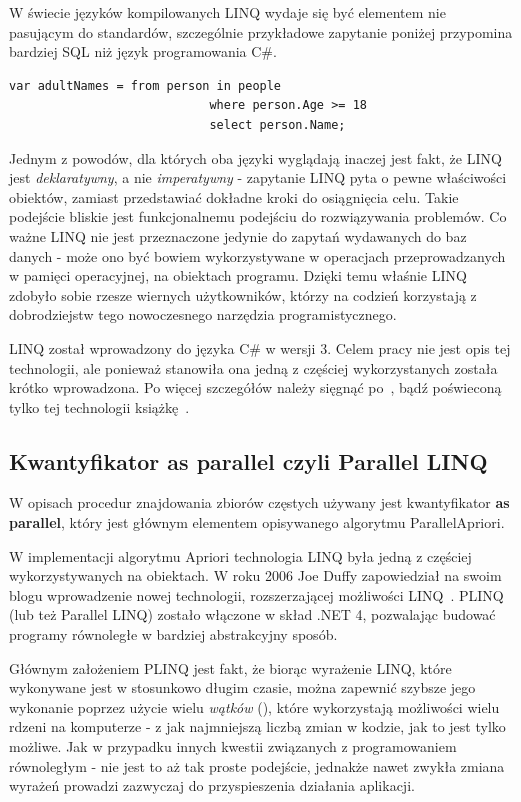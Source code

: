 W świecie języków kompilowanych LINQ wydaje się być elementem nie pasującym do standardów, szczególnie przykładowe zapytanie poniżej przypomina bardziej SQL niż język programowania C\#. 

\begin{lstlisting}
var adultNames = from person in people
							where person.Age >= 18
							select person.Name;
\end{lstlisting}

Jednym z powodów, dla których oba języki wyglądają inaczej jest fakt, że LINQ jest \emph{deklaratywny}, a nie \emph{imperatywny} - zapytanie LINQ pyta o pewne właściwości obiektów, zamiast przedstawiać dokładne kroki do osiągnięcia celu. Takie podejście bliskie jest funkcjonalnemu podejściu do rozwiązywania problemów. Co ważne LINQ nie jest przeznaczone jedynie do zapytań wydawanych do baz danych - może ono być bowiem wykorzystywane w operacjach przeprowadzanych w pamięci operacyjnej, na obiektach programu. Dzięki temu właśnie LINQ zdobyło sobie rzesze wiernych użytkowników, którzy na codzień korzystają z dobrodziejstw tego nowoczesnego narzędzia programistycznego.

LINQ został wprowadzony do języka C\# w wersji 3. Celem pracy nie jest opis tej technologii, ale ponieważ stanowiła ona jedną z częściej wykorzystanych została krótko wprowadzona. Po więcej szczegółów należy sięgnąć po~\cite{cSharp:inDepthS}, bądź poświeconą tylko tej technologii książkę~\cite{cSharp:linq}.

\subsection{Kwantyfikator as parallel czyli Parallel LINQ}\label{sec:asparallel}
W opisach procedur znajdowania zbiorów częstych używany jest kwantyfikator \textbf{as parallel}, który jest głównym elementem opisywanego algorytmu ParallelApriori. 

W implementacji algorytmu Apriori technologia LINQ była jedną z częściej wykorzystywanych na obiektach. W roku 2006 Joe Duffy zapowiedział na swoim blogu wprowadzenie nowej technologii, rozszerzającej możliwości LINQ~\cite{cs:helloplinq}. PLINQ (lub też Parallel LINQ) zostało włączone w skład .NET 4, pozwalając budować programy równoległe w bardziej abstrakcyjny sposób. 

Głównym założeniem PLINQ jest fakt, że biorąc wyrażenie LINQ, które wykonywane jest w stosunkowo długim czasie, można zapewnić szybsze jego wykonanie poprzez użycie wielu \emph{wątków} (), które wykorzystają możliwości wielu rdzeni na komputerze - z jak najmniejszą liczbą zmian w kodzie, jak to jest tylko możliwe. Jak w przypadku innych kwestii związanych z programowaniem równoległym - nie jest to aż tak proste podejście, jednakże nawet zwykła zmiana wyrażeń prowadzi zazwyczaj do przyspieszenia działania aplikacji.

